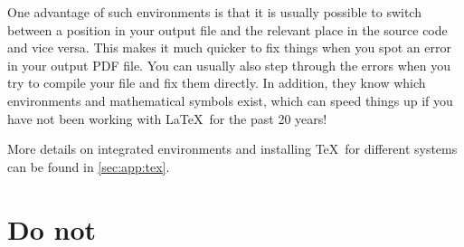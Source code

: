 One advantage of such environments is that it is usually
possible to switch between a position in your output file
and the relevant place in the source code and vice versa.
This makes it much quicker to fix
things when you spot an error in your output PDF file. You can usually
also step through the errors when you try to compile your file and fix
them directly. In addition, they know which environments and
mathematical symbols exist, which can speed things up if you have not
been working with \LaTeX\ for the past 20 years!

More details on integrated environments and installing \TeX\ for different systems can be found
in \cref{sec:app:tex}.


\section{Do not}%
\label{sec:tips:dont}

